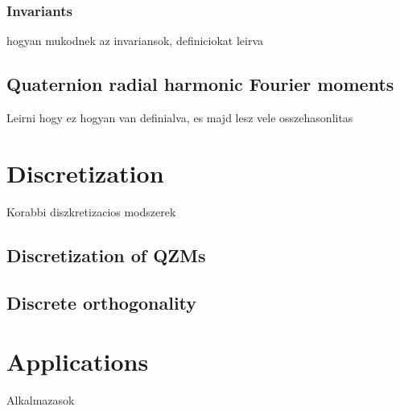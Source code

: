 \subsubsection{Invariants}
hogyan mukodnek az invariansok, definiciokat leirva

\subsection{Quaternion radial harmonic Fourier moments}
Leirni hogy ez hogyan van definialva, es majd lesz vele osszehasonlitas


\section{Discretization}
Korabbi diszkretizacios modszerek
\subsection{Discretization of QZMs}
\subsection{Discrete orthogonality}


\section{Applications}
Alkalmazasok





